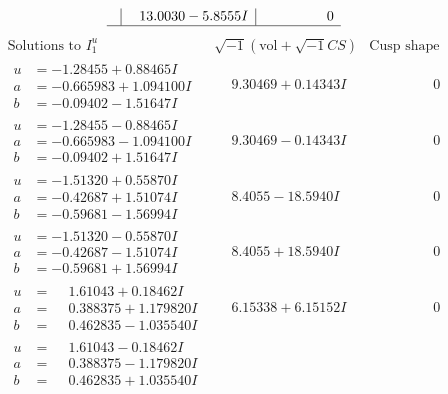 \documentclass[1p]{elsarticle_modified}
\theoremstyle{definition}
\newcommand{\I}{\sqrt{-1}}
\begin{document}
$$\begin{array}{c|c|c}
 & \phantom{-}13.0030 - 5.8555 I & \phantom{-0.000000 } 0\\
 \hline 
 \end{array}$$\newpage$$\begin{array}{c|c|c}  
\text{Solutions to }I^u_{1}& \I (\text{vol} + \sqrt{-1}CS) & \text{Cusp shape}\\
 \hline 
\begin{aligned}
u &= -1.28455 + 0.88465 I \\
a &= -0.665983 + 1.094100 I \\
b &= -0.09402 - 1.51647 I\end{aligned}
 & \phantom{-}9.30469 + 0.14343 I & \phantom{-0.000000 } 0 \\ \hline\begin{aligned}
u &= -1.28455 - 0.88465 I \\
a &= -0.665983 - 1.094100 I \\
b &= -0.09402 + 1.51647 I\end{aligned}
 & \phantom{-}9.30469 - 0.14343 I & \phantom{-0.000000 } 0 \\ \hline\begin{aligned}
u &= -1.51320 + 0.55870 I \\
a &= -0.42687 + 1.51074 I \\
b &= -0.59681 - 1.56994 I\end{aligned}
 & \phantom{-}8.4055 - 18.5940 I & \phantom{-0.000000 } 0 \\ \hline\begin{aligned}
u &= -1.51320 - 0.55870 I \\
a &= -0.42687 - 1.51074 I \\
b &= -0.59681 + 1.56994 I\end{aligned}
 & \phantom{-}8.4055 + 18.5940 I & \phantom{-0.000000 } 0 \\ \hline\begin{aligned}
u &= \phantom{-}1.61043 + 0.18462 I \\
a &= \phantom{-}0.388375 + 1.179820 I \\
b &= \phantom{-}0.462835 - 1.035540 I\end{aligned}
 & \phantom{-}6.15338 + 6.15152 I & \phantom{-0.000000 } 0 \\ \hline\begin{aligned}
u &= \phantom{-}1.61043 - 0.18462 I \\
a &= \phantom{-}0.388375 - 1.179820 I \\
b &= \phantom{-}0.462835 + 1.035540 I\end{aligned}

\end{array}$$
\end{document}
